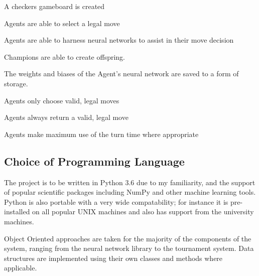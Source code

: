\documentclass[12pt,a4paper]{article}
\begin{document}
A checkers gameboard is created

Agents are able to select a legal move

Agents are able to harness neural networks to assist in their move decision

Champions are able to create offspring.

The weights and biases of the Agent's neural network are saved to a form of storage.

Agents only choose valid, legal moves

Agents always return a valid, legal move

Agents make maximum use of the turn time where appropriate
\blindtext

\subsection*{Choice of Programming Language}

The project is to be written in Python 3.6 due to my familiarity, and the support of popular scientific packages including NumPy and other machine learning tools. Python is also portable with a very wide compatability; for instance it is pre-installed on all popular UNIX machines and also has support from the university machines.

Object Oriented approaches are taken for the majority of the components of the system, ranging from the neural network library to the tournament system. Data structures are implemented using their own classes and methods where applicable. 
\end{document}
